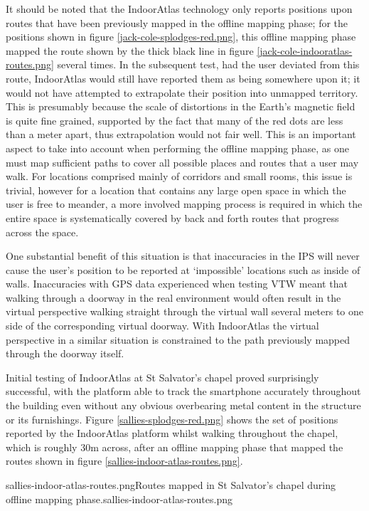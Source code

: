 It should be noted that the IndoorAtlas technology only reports positions upon routes that have been previously mapped in the offline mapping phase; for the positions shown in figure \ref{jack-cole-splodges-red.png}, this offline mapping phase mapped the route shown by the thick black line in figure \ref{jack-cole-indooratlas-routes.png} several times. In the subsequent test, had the user deviated from this route, IndoorAtlas would still have reported them as being somewhere upon it; it would not have attempted to extrapolate their position into unmapped territory. This is presumably because the scale of distortions in the Earth's magnetic field is quite fine grained, supported by the fact that many of the red dots are less than a meter apart, thus extrapolation would not fair well. This is an important aspect to take into account when performing the offline mapping phase, as one must map sufficient paths to cover all possible places and routes that a user may walk. For locations comprised mainly of corridors and small rooms, this issue is trivial, however for a location that contains any large open space in which the user is free to meander, a more involved mapping process is required in which the entire space is systematically covered by back and forth routes that progress across the space.

One substantial benefit of this situation is that inaccuracies in the IPS will never cause the user's position to be reported at `impossible' locations such as inside of walls. Inaccuracies with GPS data experienced when testing VTW meant that walking through a doorway in the real environment would often result in the virtual perspective walking straight through the virtual wall several meters to one side of the corresponding virtual doorway. With IndoorAtlas the virtual perspective in a similar situation is constrained to the path previously mapped through the doorway itself.

Initial testing of IndoorAtlas at St Salvator's chapel proved surprisingly successful, with the platform able to track the smartphone accurately throughout the building even without any obvious overbearing metal content in the structure or its furnishings. Figure \ref{sallies-splodges-red.png} shows the set of positions reported by the IndoorAtlas platform whilst walking throughout the chapel, which is roughly 30m across, after an offline mapping phase that mapped the routes shown in figure \ref{sallies-indoor-atlas-routes.png}.

       {sallies-indoor-atlas-routes.png}{Routes mapped in St Salvator's chapel during offline mapping phase.}{sallies-indoor-atlas-routes.png}


